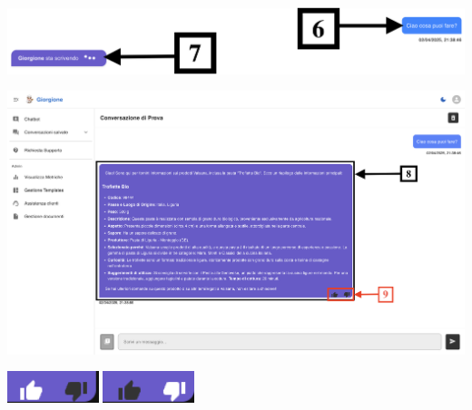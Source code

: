 \begin{center}
    \includegraphics[width=\textwidth]{./img/SchermataChat2.png}
    \label{fig:Elaborazione}
\end{center}

\begin{center}
    \includegraphics[width=\textwidth]{./img/SchermataChat3.png}
    \label{fig:Visualizzazione Risposta}
\end{center}

\begin{center}
    \includegraphics[width=0.2\textwidth]{./img/like.png}
    \hspace{0.05\textwidth}
    \includegraphics[width=0.2\textwidth]{./img/dislike.png}
    \label{fig:likedislike}
\end{center}

